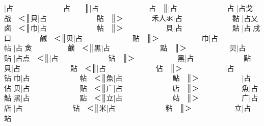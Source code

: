 {\cjk{}{\cnsym{}　　　　　　}}|{\cjk{}占{\cnsym{}　　　　　　　}占{\cnsym{}　　}}║{\cjk{}{\cnsym{}　　　　　　　}}|{\cjk{}占{\cnsym{}　　　　　　　}占{\cnsym{}　}}║{\cjk{}{\cnsym{}　　　　　　　　}}|{\cjk{}占{\cnsym{}　　　　　　　}占} 
{\cjk{}{\cnsym{}　　　　　　}}|{\cjk{}占戈{\cnsym{}　　　　　　}战{\cnsym{}　}＜}║{\cjk{}{\cnsym{}　　　　　　}貝}|{\cjk{}占{\cnsym{}　　　　　　　}貼{\cnsym{}　}}║{\cjk{}＞{\cnsym{}　　　　}禾人氺}|{\cjk{}占{\cnsym{}　　　　　　　}黏} 
{\cjk{}{\cnsym{}　　　　　　}}|{\cjk{}占乂{\cnsym{}　　　　　　}卤{\cnsym{}　}＜}║{\cjk{}{\cnsym{}　　　　　　}巾}|{\cjk{}占{\cnsym{}　　　　　　　}帖{\cnsym{}　}}║{\cjk{}＞{\cnsym{}　　　　　　}貝}|{\cjk{}占{\cnsym{}　　　　　　　}貼} 
{\cjk{}{\cnsym{}　　　　　　}}|{\cjk{}占{\cnxb{}𠂭}戌口{\cnsym{}　　　　}鹹{\cnsym{}　}＜}║{\cjk{}{\cnsym{}　　　　　　}贝}|{\cjk{}占{\cnsym{}　　　　　　　}贴{\cnsym{}　}}║{\cjk{}＞{\cnsym{}　　　　　　}巾}|{\cjk{}占{\cnsym{}　　　　　　　}帖} 
{\cjk{}{\cnsym{}　　　　　　}}|{\cjk{}占{\cnxb{}𠂭}{\cnxa{}㑒}{\cnsym{}　　　　　}鹸{\cnsym{}　}＜}║{\cjk{}{\cnsym{}　　　　　　}黑}|{\cjk{}占{\cnsym{}　　　　　　　}點{\cnsym{}　}}║{\cjk{}＞{\cnsym{}　　　　　　}贝}|{\cjk{}占{\cnsym{}　　　　　　　}贴} 
{\cjk{}{\cnsym{}　　　　　　}}|{\cjk{}占点{\cnsym{}　}＜}║{\cjk{}{\cnsym{}　　　　　　}}|{\cjk{}占{\cnsym{}　　　　　　　}钻{\cnsym{}　}}║{\cjk{}＞{\cnsym{}　　　　　　}黑}|{\cjk{}占{\cnsym{}　　　　　　　}點} 
{\cjk{}{\cnsym{}　　　　　}貝}|{\cjk{}占{\cnsym{}　　　　　　　}貼{\cnsym{}　}＜}║{\cjk{}{\cnsym{}　　　　　　}}|{\cjk{}占{\cnsym{}　　　　　　　}佔{\cnsym{}　}}║{\cjk{}＞{\cnsym{}　　　　　　}}|{\cjk{}占{\cnsym{}　　　　　　　}钻} 
{\cjk{}{\cnsym{}　　　　　}巾}|{\cjk{}占{\cnsym{}　　　　　　　}帖{\cnsym{}　}＜}║{\cjk{}{\cnsym{}　　　　　　}魚}|{\cjk{}占{\cnsym{}　　　　　　　}鮎{\cnsym{}　}}║{\cjk{}＞{\cnsym{}　　　　　　}}|{\cjk{}占{\cnsym{}　　　　　　　}佔} 
{\cjk{}{\cnsym{}　　　　　}贝}|{\cjk{}占{\cnsym{}　　　　　　　}贴{\cnsym{}　}＜}║{\cjk{}{\cnsym{}　　　　　　}广}|{\cjk{}占{\cnsym{}　　　　　　　}店{\cnsym{}　}}║{\cjk{}＞{\cnsym{}　　　　　　}魚}|{\cjk{}占{\cnsym{}　　　　　　　}鮎} 
{\cjk{}{\cnsym{}　　　　　}黑}|{\cjk{}占{\cnsym{}　　　　　　　}點{\cnsym{}　}＜}║{\cjk{}{\cnsym{}　　　　　　}立}|{\cjk{}占{\cnsym{}　　　　　　　}站{\cnsym{}　}}║{\cjk{}＞{\cnsym{}　　　　　　}广}|{\cjk{}占{\cnsym{}　　　　　　　}店} 
{\cjk{}{\cnsym{}　　　　　}}|{\cjk{}占{\cnsym{}　　　　　　　}钻{\cnsym{}　}＜}║{\cjk{}{\cnsym{}　　　　　　}米}|{\cjk{}占{\cnsym{}　　　　　　　}粘{\cnsym{}　}}║{\cjk{}＞{\cnsym{}　　　　　　}立}|{\cjk{}占{\cnsym{}　　　　　　　}站} 
